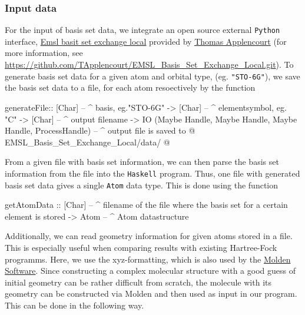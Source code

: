 \documentclass[twoside,        %
			   11pt,			%
               BCOR10mm,       %
               ngerman,english  %
               ]{scrartcl}
\begin{document}
\subsubsection{Input data}
For the input of basis set data, we integrate an open source external \texttt{Python} interface, \href{https://github.com/TApplencourt/EMSL_Basis_Set_Exchange_Local.git}{Emsl basit set exchange local} provided by \href{https://github.com/TApplencourt}{Thomas Applencourt} (for more information, see \url{https://github.com/TApplencourt/EMSL_Basis_Set_Exchange_Local.git}). To generate basis set data for a given atom and orbital type, (eg. \texttt{"STO-6G"}), we save the basis set data to a file, for each atom resoectively by the function
\begin{code}
generateFile:: [Char] -- ^ basis, eg."STO-6G"
		-> [Char] -- ^ elementsymbol, eg. "C"
		-> [Char] -- ^ output filename
		-> IO (Maybe Handle, Maybe Handle, Maybe Handle, ProcessHandle) -- ^ output file is saved to @ EMSL_Basis_Set_Exchange_Local/data/ @
\end{code}
From a given file with basis set information, we can then parse the basis set information from the file into the \texttt{Haskell} program. Thus, one file with generated basis set data gives a single \texttt{Atom} data type. This is done using the function
\begin{code}
getAtomData :: [Char] -- ^ filename of the file where the basis set for a certain element is stored
		-> Atom -- ^ Atom datastructure
\end{code}
Additionally, we can read geometry information for given atoms stored in a file. This is especially useful when comparing results with existing Hartree-Fock programms. Here, we use the xyz-formatting, which is also used by the \href{http://www.cmbi.ru.nl/molden/}{Molden Software}. Since constructing a complex molecular structure with a good guess of initial geometry can be rather difficult from scratch, the molecule with its geometry can be constructed via Molden and then used as input in our program. This can be done in the following way.
\end{document}
